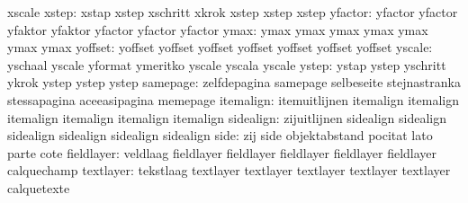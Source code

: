                            xscale
                    xstep: xstap                     xstep
                           xschritt                  xkrok
                           xstep                     xstep
                           xstep
                  yfactor: yfactor                   yfactor
                           yfaktor                   yfaktor
                           yfactor                   yfactor
                           yfactor
                     ymax: ymax                      ymax
                           ymax                      ymax
                           ymax                      ymax
                           ymax
                  yoffset: yoffset                   yoffset
                           yoffset                   yoffset
                           yoffset                   yoffset
                           yoffset
                   yscale: yschaal                   yscale
                           yformat                   ymeritko
                           yscale                    yscala
                           yscale
                    ystep: ystap                     ystep
                           yschritt                  ykrok
                           ystep                     ystep
                           ystep
                 samepage: zelfdepagina              samepage
                           selbeseite                stejnastranka
                           stessapagina              aceeasipagina
                           memepage
itemalign: itemuitlijnen             itemalign
           itemalign                 itemalign
           itemalign                 itemalign
           itemalign
                sidealign: zijuitlijnen              sidealign
                           sidealign                 sidealign
                           sidealign                 sidealign
                           sidealign
                     side: zij                       side
                           objektabstand             pocitat
                           lato                      parte
                           cote
               fieldlayer: veldlaag                  fieldlayer
                           fieldlayer                fieldlayer
                           fieldlayer                fieldlayer
                           calquechamp
                textlayer: tekstlaag                 textlayer
                           textlayer                 textlayer
                           textlayer                 textlayer
                           calquetexte

